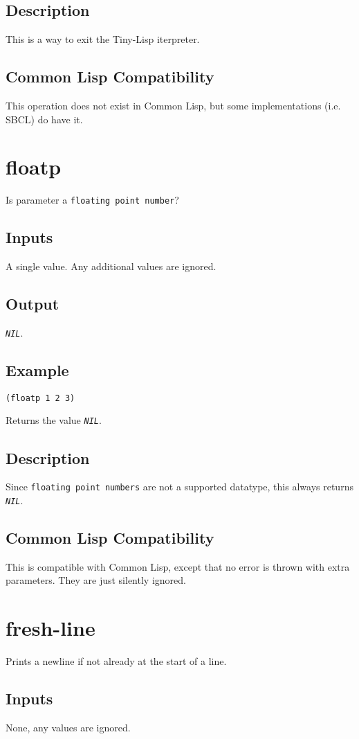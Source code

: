 \documentclass[10pt, openany]{book}
\newcommand{\constant}[1]{\emph{\texttt{#1}}}
\newcommand{\datatype}[1]{\texttt{#1}}
\newcommand{\tl}{Tiny-Lisp}
\newcommand{\cl}{Common Lisp}
\begin{document}
\subsection{Description}
This is a way to exit the \tl{} iterpreter.
\subsection{Common Lisp Compatibility}
This operation does not exist in \cl, but some implementations (i.e. SBCL) do have it.

\section{floatp}
Is parameter a \datatype{floating point number}?
\subsection{Inputs}
A single value.  Any additional values are ignored.
\subsection{Output}
\constant{NIL}.
\subsection{Example}
\begin{lstlisting}
(floatp 1 2 3)
\end{lstlisting}
Returns the value \constant{NIL}.
\subsection{Description}
Since \datatype{floating point numbers} are not a supported datatype, this always returns \constant{NIL}.
\subsection{Common Lisp Compatibility}
This is compatible with \cl, except that no error is thrown with extra parameters.  They are just silently ignored.

\section{fresh-line}
Prints a newline if not already at the start of a line.
\subsection{Inputs}
None, any values are ignored.
\end{document}
